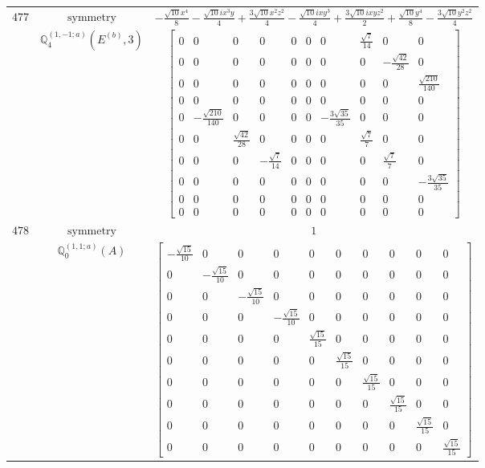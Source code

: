 \documentclass[fleqn,8pt,landscape]{jsarticle}
\begin{document}
\begin{longtable}{ccc}
$ 477 $ & $ \text{symmetry} $ & $ - \frac{\sqrt{10} x^{4}}{8} - \frac{\sqrt{10} i x^{3} y}{4} + \frac{3 \sqrt{10} x^{2} z^{2}}{4} - \frac{\sqrt{10} i x y^{3}}{4} + \frac{3 \sqrt{10} i x y z^{2}}{2} + \frac{\sqrt{10} y^{4}}{8} - \frac{3 \sqrt{10} y^{2} z^{2}}{4} $ \\
$  $ & $ \mathbb{Q}_{4}^{(1,-1;a)}(E^{(b)},3) $ & $ \begin{bmatrix} 0 & 0 & 0 & 0 & 0 & 0 & 0 & \frac{\sqrt{7}}{14} & 0 & 0 \\ 0 & 0 & 0 & 0 & 0 & 0 & 0 & 0 & - \frac{\sqrt{42}}{28} & 0 \\ 0 & 0 & 0 & 0 & 0 & 0 & 0 & 0 & 0 & \frac{\sqrt{210}}{140} \\ 0 & 0 & 0 & 0 & 0 & 0 & 0 & 0 & 0 & 0 \\ 0 & - \frac{\sqrt{210}}{140} & 0 & 0 & 0 & 0 & - \frac{3 \sqrt{35}}{35} & 0 & 0 & 0 \\ 0 & 0 & \frac{\sqrt{42}}{28} & 0 & 0 & 0 & 0 & \frac{\sqrt{7}}{7} & 0 & 0 \\ 0 & 0 & 0 & - \frac{\sqrt{7}}{14} & 0 & 0 & 0 & 0 & \frac{\sqrt{7}}{7} & 0 \\ 0 & 0 & 0 & 0 & 0 & 0 & 0 & 0 & 0 & - \frac{3 \sqrt{35}}{35} \\ 0 & 0 & 0 & 0 & 0 & 0 & 0 & 0 & 0 & 0 \\ 0 & 0 & 0 & 0 & 0 & 0 & 0 & 0 & 0 & 0 \end{bmatrix} $ \\ \hline
$ 478 $ & $ \text{symmetry} $ & $ 1 $ \\
$  $ & $ \mathbb{Q}_{0}^{(1,1;a)}(A) $ & $ \begin{bmatrix} - \frac{\sqrt{15}}{10} & 0 & 0 & 0 & 0 & 0 & 0 & 0 & 0 & 0 \\ 0 & - \frac{\sqrt{15}}{10} & 0 & 0 & 0 & 0 & 0 & 0 & 0 & 0 \\ 0 & 0 & - \frac{\sqrt{15}}{10} & 0 & 0 & 0 & 0 & 0 & 0 & 0 \\ 0 & 0 & 0 & - \frac{\sqrt{15}}{10} & 0 & 0 & 0 & 0 & 0 & 0 \\ 0 & 0 & 0 & 0 & \frac{\sqrt{15}}{15} & 0 & 0 & 0 & 0 & 0 \\ 0 & 0 & 0 & 0 & 0 & \frac{\sqrt{15}}{15} & 0 & 0 & 0 & 0 \\ 0 & 0 & 0 & 0 & 0 & 0 & \frac{\sqrt{15}}{15} & 0 & 0 & 0 \\ 0 & 0 & 0 & 0 & 0 & 0 & 0 & \frac{\sqrt{15}}{15} & 0 & 0 \\ 0 & 0 & 0 & 0 & 0 & 0 & 0 & 0 & \frac{\sqrt{15}}{15} & 0 \\ 0 & 0 & 0 & 0 & 0 & 0 & 0 & 0 & 0 & \frac{\sqrt{15}}{15} \end{bmatrix} $ \\ \hline

\end{longtable}
\end{document}
